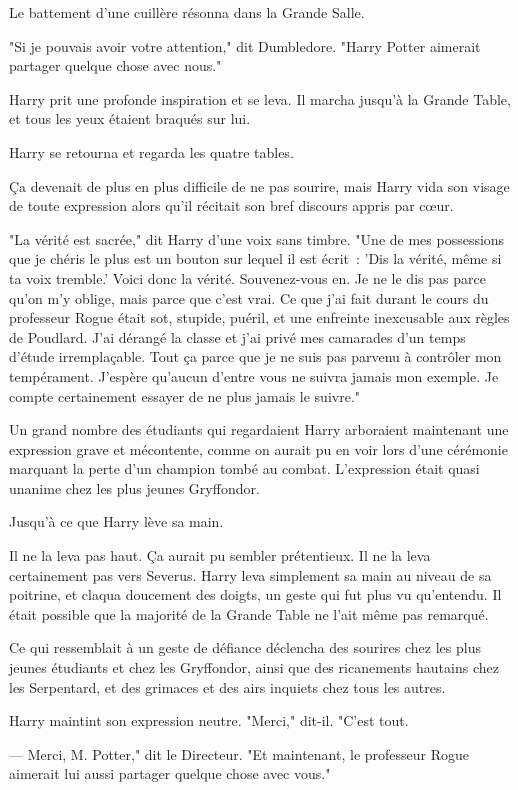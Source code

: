 Le battement d'une cuillère résonna dans la Grande Salle.

"Si je pouvais avoir votre attention," dit Dumbledore. "Harry Potter aimerait partager quelque chose avec nous."

Harry prit une profonde inspiration et se leva. Il marcha jusqu'à la Grande Table, et tous les yeux étaient braqués sur lui.

Harry se retourna et regarda les quatre tables.

Ça devenait de plus en plus difficile de ne pas sourire, mais Harry vida son visage de toute expression alors qu'il récitait son bref discours appris par cœur.

"La vérité est sacrée," dit Harry d'une voix sans timbre. "Une de mes possessions que je chéris le plus est un bouton sur lequel il est écrit~: 'Dis la vérité, même si ta voix tremble.' Voici donc la vérité. Souvenez-vous en. Je ne le dis pas parce qu'on m'y oblige, mais parce que c'est vrai. Ce que j'ai fait durant le cours du professeur Rogue était sot, stupide, puéril, et une enfreinte inexcusable aux règles de Poudlard. J'ai dérangé la classe et j'ai privé mes camarades d'un temps d'étude irremplaçable. Tout ça parce que je ne suis pas parvenu à contrôler mon tempérament. J'espère qu'aucun d'entre vous ne suivra jamais mon exemple. Je compte certainement essayer de ne plus jamais le suivre."

Un grand nombre des étudiants qui regardaient Harry arboraient maintenant une expression grave et mécontente, comme on aurait pu en voir lors d'une cérémonie marquant la perte d'un champion tombé au combat. L'expression était quasi unanime chez les plus jeunes Gryffondor.

Jusqu'à ce que Harry lève sa main.

Il ne la leva pas haut. Ça aurait pu sembler prétentieux. Il ne la leva certainement pas vers Severus. Harry leva simplement sa main au niveau de sa poitrine, et claqua doucement des doigts, un geste qui fut plus vu qu'entendu. Il était possible que la majorité de la Grande Table ne l'ait même pas remarqué.

Ce qui ressemblait à un geste de défiance déclencha des sourires chez les plus jeunes étudiants et chez les Gryffondor, ainsi que des ricanements hautains chez les Serpentard, et des grimaces et des airs inquiets chez tous les autres.

Harry maintint son expression neutre. "Merci," dit-il. "C'est tout.

--- Merci, M. Potter," dit le Directeur. "Et maintenant, le professeur Rogue aimerait lui aussi partager quelque chose avec vous."

